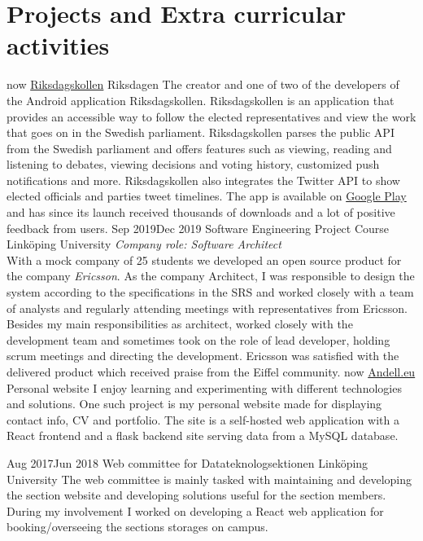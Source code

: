 \documentclass[]{k-cv} %
\begin{document}
\section{Projects and Extra curricular activities}
\begin{entrylist}
\entry
{\to now}
{\href{https://play.google.com/store/apps/details?id=se.oandell.riksdagen&hl=en}{Riksdagskollen}}
{Riksdagen}
{\small
The creator and one of two of the developers of the Android application Riksdagskollen. Riksdagskollen is an application that provides an accessible way to follow the elected representatives and view the work that goes on in the Swedish parliament. Riksdagskollen parses the public API from the Swedish parliament and offers features such as viewing, reading and listening to debates, viewing decisions and voting history, customized push notifications and more. Riksdagskollen also integrates the Twitter API to show elected officials and parties tweet timelines. The app is available on \href{https://play.google.com/store/apps/details?id=se.oandell.riksdagen&hl=en}{Google Play} and has since its launch received thousands of downloads and a lot of positive feedback from users. 
}
\entry
{Sep 2019\newline\to Dec 2019 }
{Software Engineering Project Course}
{Linköping University}
{\small \emph{Company role: Software Architect}\\ 
With a mock company of 25 students we developed an open source product for the company \textit{Ericsson}. As the company Architect, I was responsible to design the system according to the specifications in the SRS and worked closely with a team of analysts and regularly attending meetings with representatives from Ericsson. Besides my main responsibilities as architect, worked closely with the development team and sometimes took on the role of lead developer, holding scrum meetings and directing the development. 
Ericsson was satisfied with the delivered product which received praise from the Eiffel community.
}
\entry
{\to now}
{\href{http://Andell.eu/Oscar}{Andell.eu}}
{Personal website}
{\small I enjoy learning and experimenting with different technologies and solutions. One such project is my personal website made for displaying contact info, CV and portfolio. The site is a self-hosted web application with a React frontend and a flask backend site serving data from a MySQL database. }

\entry
{Aug 2017\newline\to Jun 2018}
{Web committee for Datateknologsektionen}
{Linköping University}
{\small  The web committee is mainly tasked with maintaining and developing the section website and developing solutions useful for the section members. During my involvement I worked on developing a React web application for booking/overseeing the sections storages on campus.}
\end{entrylist}
\clearpage
\end{document}
